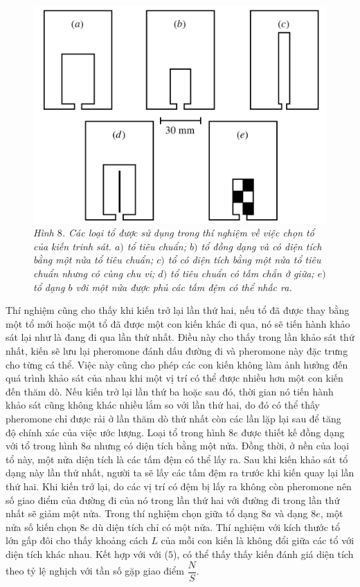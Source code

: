 \begin{multicols}{2}
	\begin{figure}[H]
		\vspace*{-5pt}
		\centering
		\captionsetup{labelformat= empty, justification=centering}
		\includegraphics[width=1\linewidth]{11}
		\caption{\small\textit{\color{toanhocdoisong}Hình $8$. Các loại tổ được sử dụng trong thí nghiệm về việc chọn tổ của kiến trinh sát. $a)$ tổ tiêu chuẩn; $b)$ tổ đồng dạng và có diện tích bằng một nửa tổ tiêu chuẩn; $c)$ tổ có diện tích bằng một nửa tổ tiêu chuẩn nhưng có cùng chu vi; $d)$ tổ tiêu chuẩn có tấm chắn ở giữa; $e)$ tổ dạng $b$ với một nửa được phủ các tấm đệm có thể nhấc ra.}}
		\vspace*{-10pt}
	\end{figure}
	Thí nghiệm cũng cho thấy khi kiến trở lại lần thứ hai, nếu tổ đã được thay bằng một tổ mới hoặc một tổ đã được một con kiến khác đi qua, nó sẽ tiến hành khảo sát lại như là đang đi qua lần thứ nhất. Điều này cho thấy trong lần khảo sát thứ nhất, kiến sẽ lưu lại pheromone đánh dấu đường đi và pheromone này đặc trưng cho từng cá thể. Việc này cũng cho phép các con kiến không làm ảnh hưởng đến quá trình khảo sát của nhau khi một vị trí có thể được nhiều hơn một con kiến đến thăm dò.
	\vskip 0.1cm
	Nếu kiến trở lại lần thứ ba hoặc sau đó, thời gian nó tiến hành khảo sát cũng không khác nhiều lắm so với lần thứ hai, do đó có thể thấy pheromone chỉ được rải ở lần thăm dò thứ nhất còn các lần lặp lại sau để tăng độ chính xác của việc ước lượng.
	\vskip 0.1cm
	Loại tổ trong hình $8e$ được thiết kế đồng dạng với tổ trong hình $8a$ nhưng có diện tích bằng một nửa. Đồng thời, ở nền của loại tổ này, một nửa diện tích là các tấm đệm có thể lấy ra. Sau khi kiến khảo sát tổ dạng này lần thứ nhất, người ta sẽ lấy các tấm đệm ra trước khi kiến quay lại lần thứ hai. Khi kiến trở lại, do các vị trí có đệm bị lấy ra không còn pheromone nên số giao điểm của đường đi của nó trong lần thứ hai với đường đi trong lần thứ nhất sẽ giảm một nửa. Trong thí nghiệm chọn giữa tổ dạng $8a$ và dạng $8e$, một nửa số kiến chọn $8e$ dù diện tích chỉ có một nửa. Thí nghiệm với kích thước tổ lớn gấp đôi cho thấy khoảng cách $L$ của mỗi con kiến là không đổi giữa các tổ với diện tích khác nhau. Kết hợp với với ($5$), có thể thấy thấy kiến đánh giá diện tích theo tỷ lệ nghịch với tần số gặp giao điểm $\dfrac{N}{S}$.

\end{multicols}
